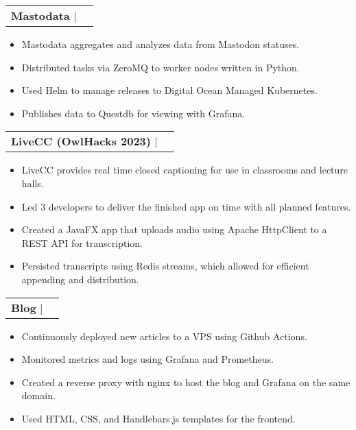 \documentclass[letterpaper,11pt]{article}
\makeatletter
\let\emph\relax
\newcommand{\resumeProjectHeading}[2]{%
    \item
    \begin{tabular*}{0.97\textwidth}{l@{\extracolsep{\fill}}r}
      \small#1 & #2 \\
    \end{tabular*}\vspace{-7pt}
}
\newenvironment{resumeItemize}
{
    \begin{itemize}
} %
{
    \end{itemize}
} %
\makeatother
\begin{document}
        \resumeProjectHeading{\textbf{Mastodata} | \emph{Kubernetes, ZeroMQ, Grafana, Python, Rust}}{}
        \begin{resumeItemize}
            \item Mastodata aggregates and analyzes data from Mastodon statuses.
            \item Distributed tasks via ZeroMQ to worker nodes written in Python.
            \item Used Helm to manage releases to Digital Ocean Managed Kubernetes.
            \item Publishes data to Questdb for viewing with Grafana.
        \end{resumeItemize}

        \resumeProjectHeading{\textbf{LiveCC (OwlHacks 2023)} $|$ \emph{Java, Python, FastAPI, JavaFX, Redis, Apache HttpClient, Docker}}{}
        \begin{resumeItemize}
            \item LiveCC provides real time closed captioning for use in
                classrooms and lecture halls.
            \item Led 3 developers to deliver the finished app on time with all
                planned features.
            \item Created a JavaFX app that uploads audio using Apache
                HttpClient to a REST API for transcription.
            \item Persisted transcripts using Redis streams, which allowed for
                efficient appending and distribution.
        \end{resumeItemize}

        \resumeProjectHeading{\textbf{Blog} $|$ \emph{Rust, Docker, Github Actions, Grafana, nginx, HTML and CSS}}{}
        \begin{resumeItemize}
            \item Continuously deployed new articles to a VPS using Github
                Actions.
            \item Monitored metrics and logs using Grafana and Prometheus.
            \item Created a reverse proxy with nginx to host the blog and
                Grafana on the same domain.
            \item Used HTML, CSS, and Handlebars.js templates for the frontend.
        \end{resumeItemize}
\end{document}

